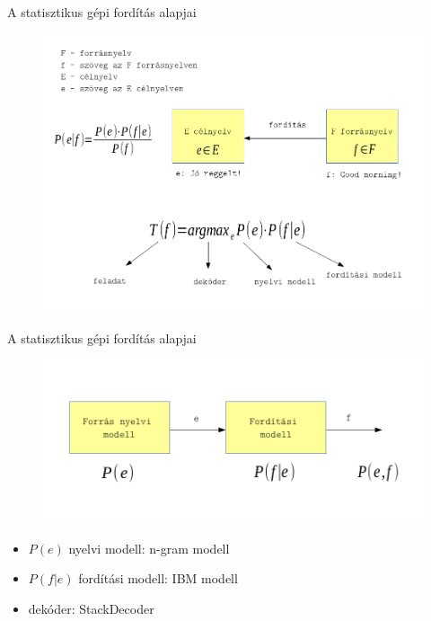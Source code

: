 \begin{frame}{A statisztikus gépi fordítás alapjai}
  \begin{figure}[t]
  	\includegraphics[width=1\linewidth]{images/smt}
  \end{figure}
\end{frame}

\begin{frame}{A statisztikus gépi fordítás alapjai}
  \begin{figure}[t]
  	\includegraphics[width=1\linewidth]{images/smt2}
  \end{figure}
  
  \begin{itemize}
  	\item $P(e)$ nyelvi modell: n-gram modell
  	\item $P(f|e)$ fordítási modell: IBM modell
  	\item dekóder: StackDecoder
  \end{itemize}
\end{frame}

